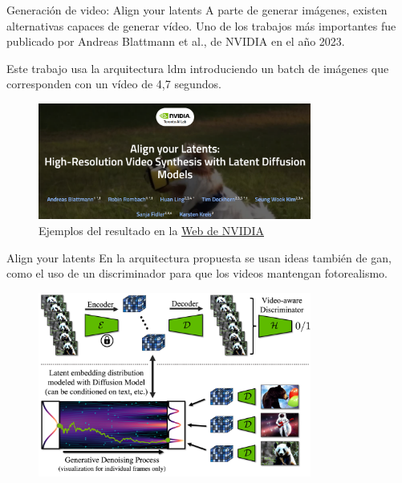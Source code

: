 \begin{frame}{Generación de video: Align your latents}
A parte de generar imágenes, existen alternativas capaces de generar vídeo. Uno de los trabajos más importantes fue publicado por Andreas Blattmann et al., de NVIDIA \cite{blattmann2023align} en el año 2023.

Este trabajo usa la arquitectura \gls{ldm} introduciendo un \alert{batch de imágenes} que corresponden con un vídeo de 4,7 segundos.

\begin{figure}
    \centering
    \includegraphics[width=0.8\textwidth]{Slides/figures/Diffusion_Models/AlignYourLatent_NVIDIA.png}
    \caption{Ejemplos del resultado en la \href{https://research.nvidia.com/labs/toronto-ai/VideoLDM/samples.html}{\alert{Web de NVIDIA}}}
\end{figure}
\end{frame}

\begin{frame}{Align your latents}
En la arquitectura propuesta se usan ideas también de \gls{gan}, como el uso de un \alert{discriminador} para que los videos mantengan fotorealismo.

\begin{figure}
    \centering
    \includegraphics[width=0.8\textwidth]{Slides/figures/Diffusion_Models/AlignYourLatent.png}
    \caption{\cite{blattmann2023align}}
\end{figure}
\end{frame}

